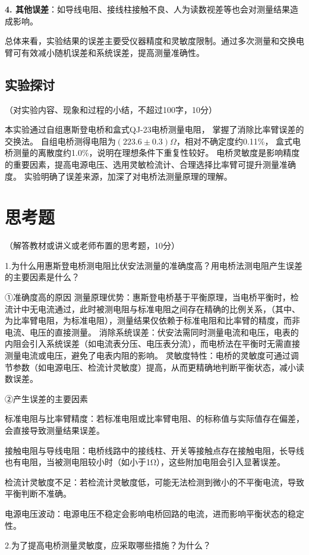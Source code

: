 \documentclass[10pt,a4paper]{ctexart}
\newcommand{\xiaosi}{\fontsize{12pt}{16pt}\selectfont}
\begin{document}
\noindent\textbf{4. 其他误差}：如导线电阻、接线柱接触不良、人为读数视差等也会对测量结果造成影响。

总体来看，实验结果的误差主要受仪器精度和灵敏度限制。通过多次测量和交换电臂可有效减小随机误差和系统误差，提高测量准确性。
    \subsection{实验探讨}
    \xiaosi （对实验内容、现象和过程的小结，不超过100字，10分）

  本实验通过自组惠斯登电桥和盒式QJ-23电桥测量电阻，
  掌握了消除比率臂误差的交换法。
自组电桥测得电阻为$(223.6 \pm 0.3) \Omega$，相对不确定度约0.11\%，
  盒式电桥测量的离散度约1.0\%，说明在理想条件下重复性较好。
  电桥灵敏度是影响精度的重要因素，提高电源电压、选用灵敏检流计、合理选择比率臂可提升测量准确度。
  实验明确了误差来源，加深了对电桥法测量原理的理解。  
\section{思考题}

    \xiaosi （解答教材或讲义或老师布置的思考题，10分）

1.为什么用惠斯登电桥测电阻比伏安法测量的准确度高？用电桥法测电阻产生误差的主要因素是什么？

①准确度高的原因
测量原理优势：惠斯登电桥基于平衡原理，当电桥平衡时，检流计中无电流通过，此时被测电阻与标准电阻之间存在精确的比例关系，（其中、为比率臂电阻，为标准电阻），测量结果仅依赖于标准电阻和比率臂的精度，而非电流、电压的直接测量。
消除系统误差：伏安法需同时测量电流和电压，电表的内阻会引入系统误差（如电流表分压、电压表分流），而电桥法在平衡时无需直接测量电流或电压，避免了电表内阻的影响。
灵敏度特性：电桥的灵敏度可通过调节参数（如电源电压、检流计灵敏度）提高，从而更精确地判断平衡状态，减小读数误差。

②产生误差的主要因素

标准电阻与比率臂精度：若标准电阻或比率臂电阻、的标称值与实际值存在偏差，会直接导致测量结果误差。

接触电阻与导线电阻：电桥线路中的接线柱、开关等接触点存在接触电阻，长导线也有电阻，当被测电阻较小时（如小于1Ω），这些附加电阻会引入显著误差。

检流计灵敏度不足：若检流计灵敏度低，可能无法检测到微小的不平衡电流，导致平衡判断不准确。

电源电压波动：电源电压不稳定会影响电桥回路的电流，进而影响平衡状态的稳定性。



2.为了提高电桥测量灵敏度，应采取哪些措施？为什么？
\end{document}
